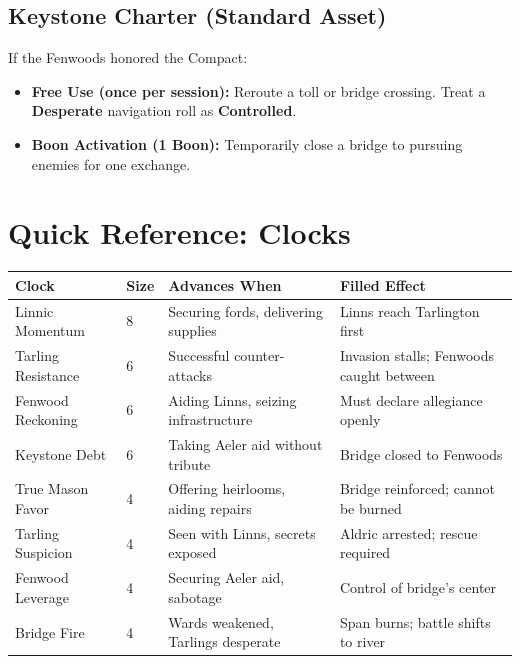 \documentclass[11pt,a5paper]{book}
\begin{document}
\section*{Keystone Charter (Standard Asset)}

If the Fenwoods honored the Compact:
\begin{itemize}[leftmargin=*]
\item \textbf{Free Use (once per session):} Reroute a toll or bridge crossing. Treat a \textbf{Desperate} navigation roll as \textbf{Controlled}.
\item \textbf{Boon Activation (1 Boon):} Temporarily close a bridge to pursuing enemies for one exchange.
\end{itemize}

\clearpage

\chapter*{Quick Reference: Clocks}

\begin{center}
\begin{tabular}{@{}llp{5cm}p{5cm}@{}}
\toprule
\textbf{Clock} & \textbf{Size} & \textbf{Advances When} & \textbf{Filled Effect} \\
\midrule
Linnic Momentum & 8 & Securing fords, delivering supplies & Linns reach Tarlington first \\
Tarling Resistance & 6 & Successful counter-attacks & Invasion stalls; Fenwoods caught between \\
Fenwood Reckoning & 6 & Aiding Linns, seizing infrastructure & Must declare allegiance openly \\
Keystone Debt & 6 & Taking Aeler aid without tribute & Bridge closed to Fenwoods \\
True Mason Favor & 4 & Offering heirlooms, aiding repairs & Bridge reinforced; cannot be burned \\
Tarling Suspicion & 4 & Seen with Linns, secrets exposed & Aldric arrested; rescue required \\
Fenwood Leverage & 4 & Securing Aeler aid, sabotage & Control of bridge's center \\
Bridge Fire & 4 & Wards weakened, Tarlings desperate & Span burns; battle shifts to river \\
\bottomrule
\end{tabular}
\end{center}
\end{document}
